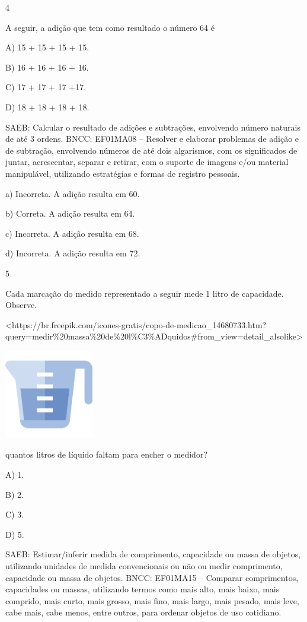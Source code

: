 \num{4}

A seguir, a adição que tem como resultado o número 64 é

A) 15 + 15 + 15 + 15.

B) 16 + 16 + 16 + 16.

C) 17 + 17 + 17 +17.

D) 18 + 18 + 18 + 18.

SAEB: Calcular o resultado de adições e subtrações, envolvendo
número naturais de até 3 ordens.
BNCC: EF01MA08 -- Resolver e elaborar problemas de adição e de subtração,
envolvendo números de até dois algarismos, com os significados de
juntar, acrescentar, separar e retirar, com o suporte de imagens e/ou
material manipulável, utilizando estratégias e formas de registro
pessoais.

a) Incorreta. A adição resulta em 60.

b) Correta. A adição resulta em 64.

c) Incorreta. A adição resulta em 68.

d) Incorreta. A adição resulta em 72.

\num{5}

Cada marcação do medido representado a seguir mede 1 litro de capacidade. Observe.

\textless{}https://br.freepik.com/icones-gratis/copo-de-medicao\_14680733.htm?query=medir\%20massa\%20de\%20l\%C3\%ADquidos\#from\_view=detail\_alsolike\textgreater{}

\includegraphics[width=1.53125in,height=1.53125in]{media/image113.png}

quantos litros de líquido faltam para encher o medidor?

A) 1.

B) 2.

C) 3.

D) 5.

SAEB: Estimar/inferir medida de comprimento, capacidade ou massa
de objetos, utilizando unidades de medida convencionais ou não ou medir
comprimento, capacidade ou massa de objetos.
BNCC: EF01MA15 -- Comparar comprimentos, capacidades ou massas,
utilizando termos como mais alto, mais baixo, mais comprido, mais curto,
mais grosso, mais fino, mais largo, mais pesado, mais leve, cabe mais,
cabe menos, entre outros, para ordenar objetos de uso cotidiano.

